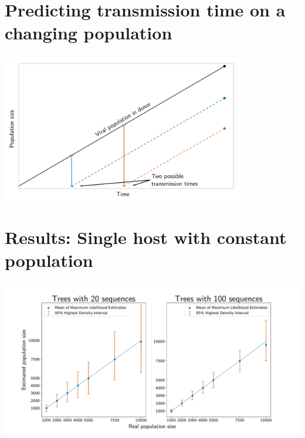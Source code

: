 \documentclass[aspectratio=169]{beamer}
\begin{document}
\section{Predicting transmission time on a changing population}

\begin{frame} \frametitle{\insertsection}

    \centering\includegraphics[width=0.8\textwidth]{images/linear-time-location}

\end{frame}

\section{Results: Single host with constant population}

\begin{frame} \frametitle{\insertsection}

    \centering\includegraphics[width=\textwidth]{images/constant-accuracy}

\end{frame}
\end{document}
